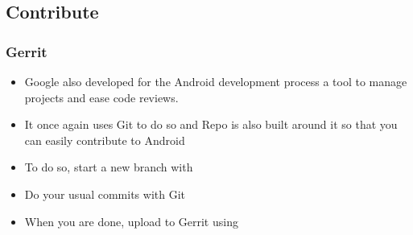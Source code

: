 \subsection{Contribute}
\begin{frame}
  \frametitle{Gerrit}
  \begin{itemize}
  \item Google also developed for the Android development process a
    tool to manage projects and ease code reviews.
  \item It once again uses Git to do so and Repo is also built around
    it so that you can easily contribute to Android
  \item To do so, start a new branch with 
  \item Do your usual commits with Git
  \item When you are done, upload to Gerrit using 
  \end{itemize}
\end{frame}
